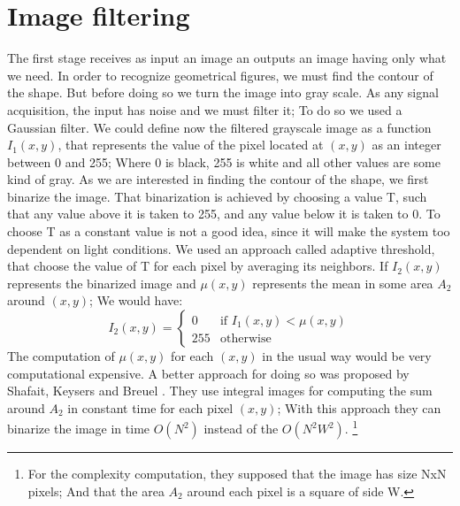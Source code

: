 \documentclass[10pt,journal]{IEEEtran}
\begin{document}
	\section{Image filtering}
	The first stage receives as input an image an outputs an image having only
	what we need. In order to recognize geometrical figures, we must find the 
	contour of the shape. But before doing so we turn the image into gray scale.
	As any signal acquisition, the input has noise and we must filter it; To do
	so we used a Gaussian filter. We could define now the filtered grayscale image
	as a function $I_1(x,y)$, that represents the value of the pixel located at
	$(x,y)$ as an integer between 0 and 255; Where 0 is black, 255 is white and
	all other values are some kind of gray.\newline
	As we are interested in finding the contour of the shape, we first binarize
	the image. That binarization is achieved by choosing a value T, such that any
	value above it is taken to 255, and any value below it is taken to 0.
	To choose T as a constant value is not a good idea, since it will make the
	system too dependent on light conditions. We used an approach called
	adaptive threshold, that choose the value of T for each pixel by averaging
	its neighbors. If $I_2(x,y)$ represents the binarized image and $\mu(x,y)$
	represents the mean in some area $A_2$ around $(x,y)$; We would have:
	\[ I_2(x,y) = \left\{ \begin{array}{ll}
		0   & \mbox{if $I_1(x,y) < \mu(x,y)$} \\
		255 & \mbox{otherwise}
	\end{array} \right. \]
	The computation of $\mu(x,y)$ for each $(x,y)$ in the usual way would
	be very computational expensive. A better approach for doing so was proposed by
	Shafait, Keysers and Breuel \cite{ocropus2}. They use integral images for computing
	the sum around $A_2$ in constant time for each pixel $(x,y)$; With this approach they
	can binarize the image in time $O(N^2)$ instead of the $O(N^2W^2).$ \footnote{For the
	complexity computation, they supposed that the image has size NxN pixels; And that
	the area $A_2$ around each pixel is a square of side W.}
	
\end{document}
